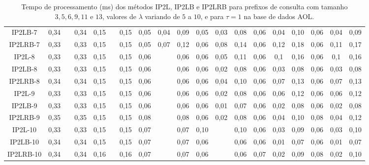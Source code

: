 \begin{table}[h]
{\begin{tabular}{c|ccc|ccc|ccc|ccc|ccc|ccc|}
\multicolumn{1}{|c|}{IP2LB-7}   & 0,34 &  & 0,34 & 0,15 &      & 0,15 & 0,05 & 0,04 & 0,09 & 0,05 & 0,03 & 0,08 & 0,06 & 0,04 & 0,10 & 0,06 & 0,04 & 0,09 \\
\multicolumn{1}{|c|}{IP2LRB-7}  & 0,33 &  & 0,33 & 0,15 &      & 0,15 & 0,05 & 0,07 & 0,12 & 0,06 & 0,08 & 0,14 & 0,06 & 0,12 & 0,18 & 0,06 & 0,11 & 0,17 \\ \hline
\multicolumn{1}{|c|}{IP2L-8}    & 0,33 &  & 0,33 & 0,15 &      & 0,15 & 0,06 &      & 0,06 & 0,06 & 0,05 & 0,11 & 0,06 & 0,1  & 0,16 & 0,06 & 0,1  & 0,16 \\
\multicolumn{1}{|c|}{IP2LB-8}   & 0,33 &  & 0,33 & 0,15 &      & 0,15 & 0,06 &      & 0,06 & 0,06 & 0,02 & 0,08 & 0,06 & 0,03 & 0,08 & 0,06 & 0,03 & 0,08 \\
\multicolumn{1}{|c|}{IP2LRB-8}  & 0,34 &  & 0,34 & 0,15 &      & 0,15 & 0,06 &      & 0,06 & 0,06 & 0,04 & 0,10 & 0,06 & 0,07 & 0,13 & 0,06 & 0,07 & 0,13 \\ \hline
\multicolumn{1}{|c|}{IP2L-9}    & 0,33 &  & 0,33 & 0,15 &      & 0,15 & 0,06 &      & 0,06 & 0,06 & 0,02 & 0,08 & 0,06 & 0,06 & 0,12 & 0,06 & 0,06 & 0,12 \\
\multicolumn{1}{|c|}{IP2LB-9}   & 0,33 &  & 0,33 & 0,15 &      & 0,15 & 0,06 &      & 0,06 & 0,06 & 0,01 & 0,07 & 0,06 & 0,02 & 0,08 & 0,06 & 0,02 & 0,08 \\
\multicolumn{1}{|c|}{IP2LRB-9}  & 0,35 &  & 0,35 & 0,15 &      & 0,15 & 0,08 &      & 0,08 & 0,06 & 0,02 & 0,08 & 0,06 & 0,04 & 0,10 & 0,08 & 0,04 & 0,12 \\ \hline
\multicolumn{1}{|c|}{IP2L-10}   & 0,33 &  & 0,33 & 0,15 &      & 0,15 & 0,07 &      & 0,07 & 0,10 &      & 0,10 & 0,06 & 0,03 & 0,09 & 0,06 & 0,03 & 0,10 \\
\multicolumn{1}{|c|}{IP2LB-10}  & 0,34 &  & 0,34 & 0,15 &      & 0,15 & 0,07 &      & 0,07 & 0,06 &      & 0,06 & 0,06 & 0,01 & 0,07 & 0,06 & 0,01 & 0,07 \\
\multicolumn{1}{|c|}{IP2LRB-10} & 0,34 &  & 0,34 & 0,16 &      & 0,16 & 0,07 &      & 0,07 & 0,06 &      & 0,06 & 0,07 & 0,02 & 0,09 & 0,08 & 0,02 & 0,10 \\ \hline
\end{tabular}%
}
\caption{Tempo de processamento (ms) dos métodos IP2L, IP2LB e IP2LRB para prefixos de consulta com tamanho $3,5,6,9,11$ e $13$, valores de $\lambda$ variando de $5$ a $10$, e para $\tau=1$ na base de dados AOL.}
\label{tab:methods-processing-time-tau-1-AOL}
\end{table}


